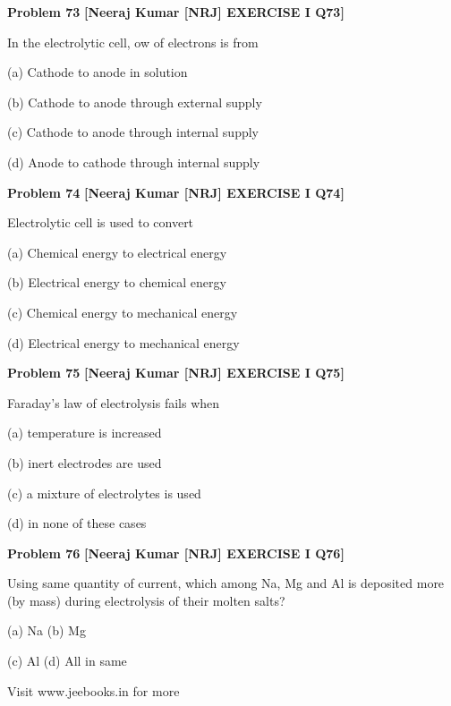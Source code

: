 \begin{problembox}
\textbf{Problem 73} \hfill \textbf{[Neeraj Kumar [NRJ] EXERCISE I Q73]}
\label{q:ext-nrj_all_questions-73}

In the electrolytic cell,   ow of electrons is from
 
 (a) Cathode to anode in solution
 
 (b)  Cathode to anode through external supply
 
 (c)  Cathode to anode through internal supply
 
 (d)  Anode to cathode through internal supply
\end{problembox}

\begin{problembox}
\textbf{Problem 74} \hfill \textbf{[Neeraj Kumar [NRJ] EXERCISE I Q74]}
\label{q:ext-nrj_all_questions-74}

Electrolytic cell is used to convert
 
 (a) Chemical energy to electrical energy
 
 (b) Electrical energy to chemical energy
 
 (c)  Chemical energy to mechanical energy
 
 (d)  Electrical energy to mechanical energy
\end{problembox}

\begin{problembox}
\textbf{Problem 75} \hfill \textbf{[Neeraj Kumar [NRJ] EXERCISE I Q75]}
\label{q:ext-nrj_all_questions-75}

Faraday's law of electrolysis fails when
 
 (a) temperature is increased
 
 (b) inert electrodes are used
 
 (c) a mixture of electrolytes is used
 
 (d) in none of these cases
\end{problembox}

\begin{problembox}
\textbf{Problem 76} \hfill \textbf{[Neeraj Kumar [NRJ] EXERCISE I Q76]}
\label{q:ext-nrj_all_questions-76}

Using same quantity of current, which among Na, 
Mg and Al is deposited more (by mass) during 
electrolysis of their molten salts?
 
 (a) Na 
(b) Mg
 
 (c) Al 
(d) All in same
 
 
Visit www.jeebooks.in for more
\end{problembox}

